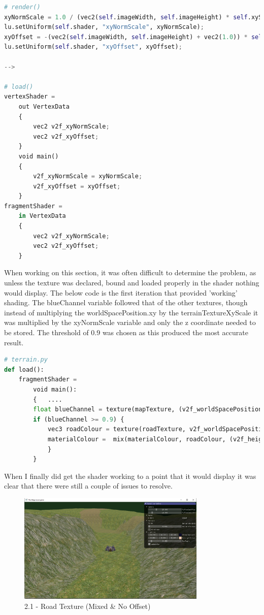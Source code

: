 \documentclass[a4 paper, 12pt]{article}
\begin{document}
\begin{lstlisting}[language=python]
# render()      
xyNormScale = 1.0 / (vec2(self.imageWidth, self.imageHeight) * self.xyScale);
lu.setUniform(self.shader, "xyNormScale", xyNormScale);
xyOffset = -(vec2(self.imageWidth, self.imageHeight) + vec2(1.0)) * self.xyScale / 2.0;
lu.setUniform(self.shader, "xyOffset", xyOffset);

--> 

# load()
vertexShader =
    out VertexData
    {
        vec2 v2f_xyNormScale;
        vec2 v2f_xyOffset;
    }
    void main()
    {
        v2f_xyNormScale = xyNormScale;
        v2f_xyOffset = xyOffset;
    }
fragmentShader = 
    in VertexData
    {
        vec2 v2f_xyNormScale;
        vec2 v2f_xyOffset;
    }
    \end{lstlisting}

When working on this section, it was often difficult to determine the problem, as unless the texture was declared, bound and loaded properly in the shader nothing would display. The below code is the first iteration that provided 'working' shading. The blueChannel variable followed that of the other textures, though instead of multiplying the worldSpacePosition.xy by the terrainTextureXyScale it was multiplied by the xyNormScale variable and only the z coordinate needed to be stored. The threshold of 0.9 was chosen as this produced the most accurate result. 
\begin{lstlisting}[language=python]
# terrain.py       
def load():
    fragmentShader =                 
        void main():
        {   ....
        float blueChannel = texture(mapTexture, (v2f_worldSpacePosition.xy) * v2f_xyNormScale).z;
        if (blueChannel >= 0.9) {
            vec3 roadColour = texture(roadTexture, v2f_worldSpacePosition.xy * terrainTextureXyScale).xyz;
            materialColour =  mix(materialColour, roadColour, (v2f_height/terrainHeightScale));
            }
        }
\end{lstlisting} 

When I finally did get the shader working to a point that it would display it was clear that there were still a couple of issues to resolve.

\begin{figure} [H]
    \centering
    \includegraphics[width=0.8\textwidth, frame]
        {./images/2.1_c_1.PNG}
    \caption{2.1 - Road Texture (Mixed \& No Offset)}   
\end{figure}
\end{document}
